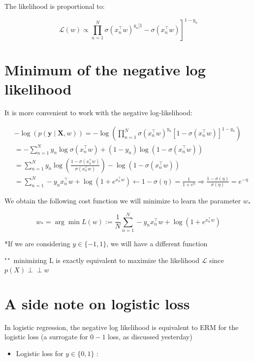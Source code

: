 \documentclass[10pt]{article}
\def\Perp{\perp\!\!\!\perp}
\begin{document}
The likelihood is proportional to:

$$
\left.\mathscr{L}(w) \propto \prod_{n=1}^{N} \sigma\left(x_{n}^{\top} w\right)^{y_{n}[1}-\sigma\left(x_{n}^{\top} w\right)\right]^{1-y_{n}}
$$

\section*{Minimum of the negative log likelihood}
It is more convenient to work with the negative log-likelihood:

$$
\begin{aligned}
& -\log (p(\mathbf{y} \mid \mathbf{X}, w))=-\log \left(\prod_{n=1}^{N} \sigma\left(x_{n}^{\top} w\right)^{y_{n}}\left[1-\sigma\left(x_{n}^{\top} w\right)\right]^{1-y_{n}}\right) \\
& =-\sum_{n=1}^{N} y_{n} \log \sigma\left(x_{n}^{\top} w\right)+\left(1-y_{n}\right) \log \left(1-\sigma\left(x_{n}^{\top} w\right)\right) \\
& =\sum_{n=1}^{N} y_{n} \log \left(\frac{1-\sigma\left(x_{n}^{\top} w\right)}{\sigma\left(x_{n}^{\top} w\right)}\right)-\log \left(1-\sigma\left(x_{n}^{\top} w\right)\right) \\
& =\sum_{n=1}^{N}-y_{n} x_{n}^{\top} w+\log \left(1+e^{x_{n}^{\top} w}\right) \longleftarrow 1-\sigma(\eta)=\frac{1}{1+e^{\eta}} \Longrightarrow \frac{1-\sigma(\eta)}{\sigma(\eta)}=e^{-\eta}
\end{aligned}
$$

We obtain the following cost function we will minimize to learn the parameter $w_{*}$

$$
w_{*}=\arg \min L(w):=\frac{1}{N} \sum_{n=1}^{N}-y_{n} x_{n}^{\top} w+\log \left(1+e^{x_{n}^{\top} w}\right)
$$

*If we are considering $y \in\{-1,1\}$, we will have a different function

${ }^{\star \star}$ minimizing $\mathrm{L}$ is exactly equivalent to maximize the likelihood $\mathscr{L}$ since $p(X) \Perp w$

\section*{A side note on logistic loss}
In logistic regression, the negative log likelihood is equivalent to ERM for the logistic loss (a surrogate for $0-1$ loss, as discussed yesterday)

\begin{itemize}
  \item Logistic loss for $y \in\{0,1\}$ :
\end{itemize}
\end{document}
